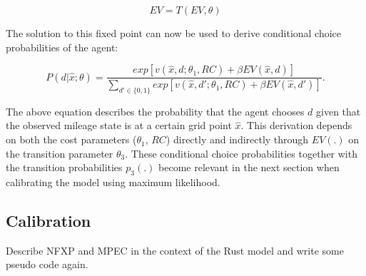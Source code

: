 \begin{equation}
	EV = T(EV, \theta)
\end{equation}

The solution to this fixed point can now be used to derive conditional choice probabilities of the agent: 

\begin{equation}
	P(d|\hat x; \theta) = \frac{exp[v(\hat x, d; \theta_1, RC) + \beta EV(\hat x, d)]}{\sum_{d' \in \{0, 1\}} exp[v(\hat x, d'; \theta_1, RC) + \beta EV(\hat x, d')]}.
\end{equation}

The above equation describes the probability that the agent chooses $d$ given that the observed mileage state is at a certain grid point $\hat x$. This derivation depends on both the cost parameters ($\theta_1$, $RC$) directly and indirectly through $EV(.)$ on the transition parameter $\theta_3$. These conditional choice probabilities together with the transition probabilities $p_3(.)$ become relevant in the next section when calibrating the model using maximum likelihood. 


\subsection{Calibration}

Describe NFXP and MPEC in the context of the Rust model and write some pseudo code again.
